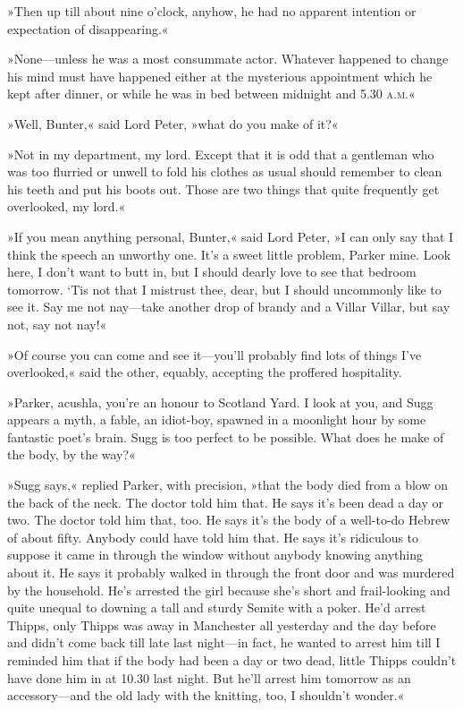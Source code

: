 »Then up till about nine o'clock, anyhow, he had no apparent intention or expectation of disappearing.«

»None—unless he was a most consummate actor. Whatever happened to change his mind must have happened either at the mysterious appointment which he kept after dinner, or while he was in bed between midnight and 5.30 \textsc{a.m.}«

»Well, Bunter,« said Lord Peter, »what do you make of it?«

»Not in my department, my lord. Except that it is odd that a gentleman who was too flurried or unwell to fold his clothes as usual should remember to clean his teeth and put his boots out. Those are two things that quite frequently get overlooked, my lord.«

»If you mean anything personal, Bunter,« said Lord Peter, »I can only say that I think the speech an unworthy one. It's a sweet little problem, Parker mine. Look here, I don't want to butt in, but I should dearly love to see that bedroom tomorrow. `Tis not that I mistrust thee, dear, but I should uncommonly like to see it. Say me not nay—take another drop of brandy and a Villar Villar, but say not, say not nay!«

»Of course you can come and see it—you'll probably find lots of things I've overlooked,« said the other, equably, accepting the proffered hospitality.

»Parker, acushla, you're an honour to Scotland Yard. I look at you, and Sugg appears a myth, a fable, an idiot-boy, spawned in a moonlight hour by some fantastic poet's brain. Sugg is too perfect to be possible. What does he make of the body, by the way?«

»Sugg says,« replied Parker, with precision, »that the body died from a blow on the back of the neck. The doctor told him that. He says it's been dead a day or two. The doctor told him that, too. He says it's the body of a well-to-do Hebrew of about fifty. Anybody could have told him that. He says it's ridiculous to suppose it came in through the window without anybody knowing anything about it. He says it probably walked in through the front door and was murdered by the household. He's arrested the girl because she's short and frail-looking and quite unequal to downing a tall and sturdy Semite with a poker. He'd arrest Thipps, only Thipps was away in Manchester all yesterday and the day before and didn't come back till late last night—in fact, he wanted to arrest him till I reminded him that if the body had been a day or two dead, little Thipps couldn't have done him in at 10.30 last night. But he'll arrest him tomorrow as an accessory—and the old lady with the knitting, too, I shouldn't wonder.«


